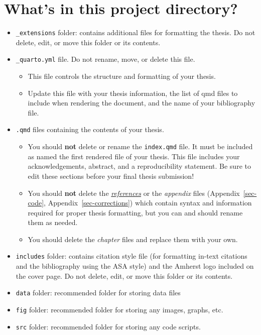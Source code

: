 \documentclass[
  11pt,
  letterpaper,
  twoside]{report}
\providecommand{\tightlist}{%
  \setlength{\itemsep}{0pt}\setlength{\parskip}{0pt}}\usepackage{longtable,booktabs,array}
\begin{document}
\section{What's in this project
directory?}\label{whats-in-this-project-directory}

\begin{itemize}
\item
  \texttt{\_extensions} folder: contains additional files for formatting
  the thesis. Do not delete, edit, or move this folder or its contents.
\item
  \texttt{\_quarto.yml} file. Do not rename, move, or delete this file.

  \begin{itemize}
  \tightlist
  \item
    This file controls the structure and formatting of your thesis.
  \item
    Update this file with your thesis information, the list of qmd files
    to include when rendering the document, and the name of your
    bibliography file.
  \end{itemize}
\item
  \texttt{.qmd} files containing the contents of your thesis.

  \begin{itemize}
  \tightlist
  \item
    You should \textbf{not} delete or rename the \texttt{index.qmd}
    file. It must be included as named the first rendered file of your
    thesis. This file includes your acknowledgements, abstract, and a
    reproducibility statement. Be sure to edit these sections before
    your final thesis submission!
  \item
    You should \textbf{not} delete the
    \hyperref[references]{\emph{references}} or the \emph{appendix}
    files (Appendix~\ref{sec-code}, Appendix~\ref{sec-corrections})
    which contain syntax and information required for proper thesis
    formatting, but you can and should rename them as needed.
  \item
    You should delete the \emph{chapter} files and replace them with
    your own.
  \end{itemize}
\item
  \texttt{includes} folder: contains citation style file (for formatting
  in-text citations and the bibliography using the ASA style) and the
  Amherst logo included on the cover page. Do not delete, edit, or move
  this folder or its contents.
\item
  \texttt{data} folder: recommended folder for storing data files
\item
  \texttt{fig} folder: recommended folder for storing any images,
  graphs, etc.
\item
  \texttt{src} folder: recommended folder for storing any code scripts.
\end{itemize}
\end{document}
